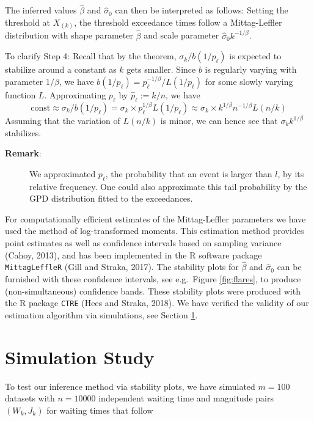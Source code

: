 \documentclass[]{elsarticle} %
\begin{document}
The inferred values \(\hat \beta\) and \(\hat \sigma_0\) can then be
interpreted as follows: Setting the threshold at \(X_{(k)}\), the
threshold exceedance times follow a Mittag-Leffler distribution with
shape parameter \(\hat \beta\) and scale parameter
\(\hat \sigma_0 k^{-1/\beta}\).

To clarify Step 4: Recall that by the theorem,
\(\sigma_k / b(1/p_{\ell})\) is expected to stabilize around a constant
as \(k\) gets smaller. Since \(b\) is regularly varying with parameter
\(1/\beta\), we have
\(b(1/p_{\ell}) = p_{\ell}^{-1/\beta} / L(1/p_{\ell})\) for some slowly
varying function \(L\). Approximating \(p_{\ell}\) by
\(\hat p_{\ell} := k / n\), we have
\[\text{const} \approx \sigma_k / b(1/p_{\ell}) = \sigma_k \times p_{\ell}^{1/\beta} L(1/p_{\ell}) \approx \sigma_k \times k^{1/\beta} n^{-1/\beta} L(n/k)\]
Assuming that the variation of \(L(n/k)\) is minor, we can hence see
that \(\sigma_k k^{1/\beta}\) stabilizes.

\begin{description}
\item[\textbf{Remark}:]
We approximated \(p_{\ell}\), the probability that an event is larger
than \(l\), by its relative frequency. One could also approximate this
tail probability by the GPD distribution fitted to the exceedances.
\end{description}

For computationally efficient estimates of the Mittag-Leffler parameters
we have used the method of log-transformed moments. This estimation
method provides point estimates as well as confidence intervals based on
sampling variance (Cahoy, 2013), and has been implemented in the R
software package \texttt{MittagLeffleR} (Gill and Straka, 2017). The
stability plots for \(\hat \beta\) and \(\hat \sigma_0\) can be
furnished with these confidence intervals, see e.g.~Figure
\ref{fig:flares}, to produce (non-simultaneous) confidence bands. These
stability plots were produced with the R package \texttt{CTRE} (Hees and
Straka, 2018). We have verified the validity of our estimation algorithm
via simulations, see Section \ref{Simulationstudy}.

\hypertarget{Simulationstudy}{%
\section{Simulation Study}\label{Simulationstudy}}

To test our inference method via stability plots, we have simulated
\(m=100\) datasets with \(n=10000\) independent waiting time and
magnitude pairs \((W_k, J_k)\) for waiting times that follow
\end{document}
